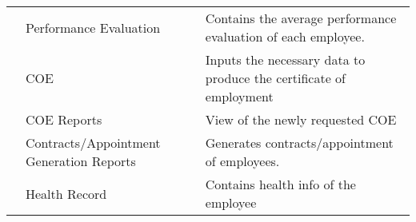 \begin{table}[H]
\begin{tabular}{@{}cll@{}}
                     & Performance Evaluation                   & Contains the average performance evaluation of each employee.                         \\
                     & COE                                      & Inputs the necessary data to produce the certificate of employment                    \\
                     & COE Reports                              & View of the newly requested COE                                                       \\
                     & Contracts/Appointment Generation Reports & Generates contracts/appointment of employees.                                         \\
                     & Health Record                            & Contains health info of the employee                                                  \\ \bottomrule
\end{tabular}
\end{table}